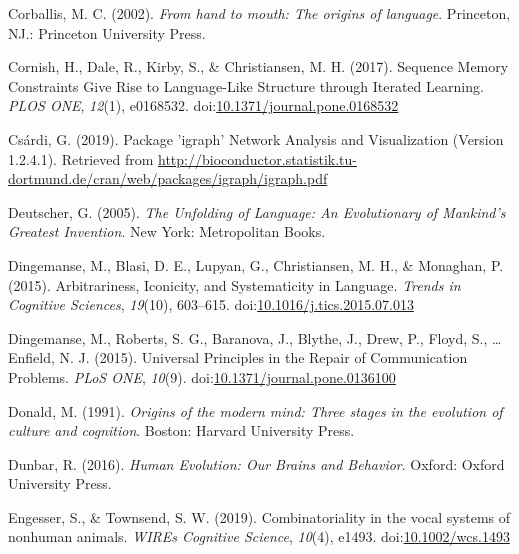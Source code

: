 \documentclass[
  man, noextraspace,floatsintext]{apa6}
\newlength{\cslhangindent}
\newenvironment{cslreferences}%
  {\setlength{\parindent}{0pt}%
  \everypar{\setlength{\hangindent}{\cslhangindent}}\ignorespaces}%
  {\par}
\begin{document}
\begin{cslreferences}
\leavevmode\hypertarget{ref-corballisHandMouthOrigins2002}{}%
Corballis, M. C. (2002). \emph{From hand to mouth: The origins of language}. Princeton, NJ.: Princeton University Press.

\leavevmode\hypertarget{ref-cornishSequenceMemoryConstraints2017}{}%
Cornish, H., Dale, R., Kirby, S., \& Christiansen, M. H. (2017). Sequence Memory Constraints Give Rise to Language-Like Structure through Iterated Learning. \emph{PLOS ONE}, \emph{12}(1), e0168532. doi:\href{https://doi.org/10.1371/journal.pone.0168532}{10.1371/journal.pone.0168532}

\leavevmode\hypertarget{ref-csardiPackageIgraphNetwork2019}{}%
Csárdi, G. (2019). Package 'igraph' Network Analysis and Visualization (Version 1.2.4.1). Retrieved from \url{http://bioconductor.statistik.tu-dortmund.de/cran/web/packages/igraph/igraph.pdf}

\leavevmode\hypertarget{ref-deutscherUnfoldingLanguageEvolutionary2005}{}%
Deutscher, G. (2005). \emph{The Unfolding of Language: An Evolutionary of Mankind's Greatest Invention}. New York: Metropolitan Books.

\leavevmode\hypertarget{ref-dingemanseArbitrarinessIconicitySystematicity2015b}{}%
Dingemanse, M., Blasi, D. E., Lupyan, G., Christiansen, M. H., \& Monaghan, P. (2015). Arbitrariness, Iconicity, and Systematicity in Language. \emph{Trends in Cognitive Sciences}, \emph{19}(10), 603--615. doi:\href{https://doi.org/10.1016/j.tics.2015.07.013}{10.1016/j.tics.2015.07.013}

\leavevmode\hypertarget{ref-dingemanseUniversalPrinciplesRepair2015}{}%
Dingemanse, M., Roberts, S. G., Baranova, J., Blythe, J., Drew, P., Floyd, S., \ldots{} Enfield, N. J. (2015). Universal Principles in the Repair of Communication Problems. \emph{PLoS ONE}, \emph{10}(9). doi:\href{https://doi.org/10.1371/journal.pone.0136100}{10.1371/journal.pone.0136100}

\leavevmode\hypertarget{ref-donaldOriginsModernMind1991}{}%
Donald, M. (1991). \emph{Origins of the modern mind: Three stages in the evolution of culture and cognition}. Boston: Harvard University Press.

\leavevmode\hypertarget{ref-dunbarHumanEvolutionOur2016}{}%
Dunbar, R. (2016). \emph{Human Evolution: Our Brains and Behavior}. Oxford: Oxford University Press.

\leavevmode\hypertarget{ref-engesserCombinatorialityVocalSystems2019}{}%
Engesser, S., \& Townsend, S. W. (2019). Combinatoriality in the vocal systems of nonhuman animals. \emph{WIREs Cognitive Science}, \emph{10}(4), e1493. doi:\href{https://doi.org/10.1002/wcs.1493}{10.1002/wcs.1493}


\end{cslreferences}
\end{document}
